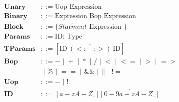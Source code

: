 \documentclass[12pt]{article}
\newcommand\bnf{\,\,|\,\,}
\renewcommand\c[1]{\text{#1}}
\begin{document}
\begin{align*}
  \textbf{Unary} & ::= \c{Uop Expression} \\
  \textbf{Binary} & ::= \c{Expression Bop Expression} \\
  \textbf{Block} & ::= \c{\{ $\overline{Statment}$ Expression \}} \\
  \textbf{Params} & ::= \c{ID: Type} \\
  \textbf{TParams} & ::= [\overline{\c{ID}~(<: \bnf :>)~\c{ID}}] \\
  \textbf{Bop} & ::= - \bnf + \bnf * \bnf / \bnf < \bnf <= \bnf > \bnf => \\
      & \bnf \% \bnf == \bnf \&\& \bnf \texttt{||} \bnf != \\
  \textbf{Uop} & ::= - \bnf ! \\
  \textbf{ID} & ::= [a-zA-Z\_]\overline{[0-9a-zA-Z\_]}
\end{align*}




%
%
%



\end{document}
